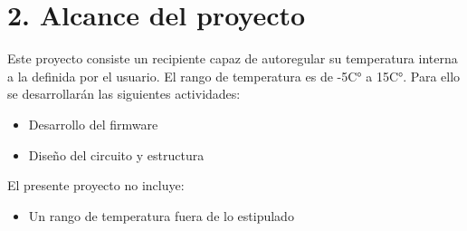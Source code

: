 \section{2. Alcance del proyecto}
\label{sec:alcance}

\quad Este proyecto consiste un recipiente capaz de autoregular su temperatura interna a la definida por el usuario. El rango de temperatura es de -5C° a 15C°.
Para ello se desarrollarán las siguientes actividades:
\begin{itemize}
  \item Desarrollo del firmware
  \item Diseño del circuito y estructura
\end{itemize}
El presente proyecto no incluye:
\begin{itemize}
  \item Un rango de temperatura fuera de lo estipulado
\end{itemize}